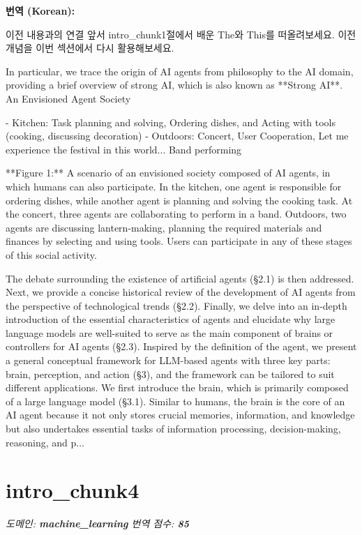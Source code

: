 \documentclass[12pt,a4paper]{article}
\begin{document}
\begin{mdframed}[style=ko]
\noindent\textbf{\small 번역 (Korean):}\\[2pt]
\begin{linkbox}{이전 내용과의 연결}
  앞서 intro_chunk1절에서 배운 The와 This를 떠올려보세요. 이전 개념을 이번 섹션에서 다시 활용해보세요.
\end{linkbox}
In particular, we trace the origin of AI agents from philosophy to the AI domain, providing a brief overview of strong AI, which is also known as **Strong AI**. An Envisioned Agent Society

- Kitchen: Task planning and solving, Ordering dishes, and Acting with tools (cooking, discussing decoration)
- Outdoors: Concert, User Cooperation, Let me experience the festival in this world... Band performing

**Figure 1:** A scenario of an envisioned society composed of AI agents, in which humans can also participate. In the kitchen, one agent is responsible for ordering dishes, while another agent is planning and solving the cooking task. At the concert, three agents are collaborating to perform in a band. Outdoors, two agents are discussing lantern-making, planning the required materials and finances by selecting and using tools. Users can participate in any of these stages of this social activity.

The debate surrounding the existence of artificial agents (§2.1) is then addressed. Next, we provide a concise historical review of the development of AI agents from the perspective of technological trends (§2.2). Finally, we delve into an in-depth introduction of the essential characteristics of agents and elucidate why large language models are well-suited to serve as the main component of brains or controllers for AI agents (§2.3). Inspired by the definition of the agent, we present a general conceptual framework for LLM-based agents with three key parts: brain, perception, and action (§3), and the framework can be tailored to suit different applications. We first introduce the brain, which is primarily composed of a large language model (§3.1). Similar to humans, the brain is the core of an AI agent because it not only stores crucial memories, information, and knowledge but also undertakes essential tasks of information processing, decision-making, reasoning, and p...
\end{mdframed}
\vspace{1em}

\section{intro\_chunk4}
\noindent\textit{\small 도메인: \textbf{machine\_learning} \quad 번역 점수: \textbf{\color{green!60!black}85}}
\vspace{0.5em}
\end{document}
